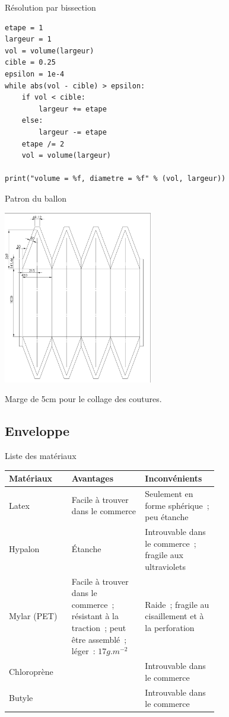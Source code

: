 \begin{frame}[fragile]{Résolution par bissection}
  \begin{lstlisting}[frame=single]
etape = 1
largeur = 1
vol = volume(largeur)
cible = 0.25
epsilon = 1e-4
while abs(vol - cible) > epsilon:
	if vol < cible:
		largeur += etape
	else:
		largeur -= etape
	etape /= 2
	vol = volume(largeur)

print("volume = %f, diametre = %f" % (vol, largeur))
  \end{lstlisting}
\end{frame}

\begin{frame}{Patron du ballon}
  \begin{center}
    \includegraphics[width=6.5cm, angle=270]{../Images/plan_ballon.png}
  \end{center}
  Marge de 5cm pour le collage des coutures.
\end{frame}

\subsection{Enveloppe}

\begin{frame}{Liste des matériaux}
	\begin{tabular}{|l|p{0.35\linewidth}|p{0.35\linewidth}|}
		\hline
		Matériaux & Avantages & Inconvénients \\
		\hline

		\rowcolor{OrangeT}
		Latex &
		Facile à trouver dans le commerce &
		Seulement en forme sphérique~; peu étanche \\
		\hline

		\rowcolor{RedT}
		Hypalon & Étanche & Introuvable dans le commerce~; fragile aux ultraviolets \\
		\hline

		\rowcolor{GreenT}
		Mylar (PET) &
		Facile à trouver dans le commerce~; résistant à la traction~; peut être assemblé~; léger~: $17 g.m^{-2}$ &
		Raide~; fragile au cisaillement et à la perforation \\
		\hline

		\rowcolor{RedT}
		Chloroprène &
		& Introuvable dans le commerce \\
		\hline

		\rowcolor{RedT}
		Butyle &
		& Introuvable dans le commerce \\
		\hline
	\end{tabular}
\end{frame}

